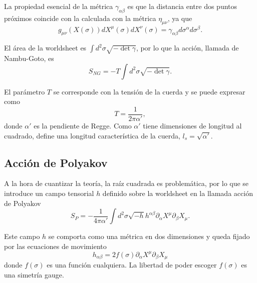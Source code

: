 La propiedad esencial de la métrica $\gamma_{\alpha\beta}$ es que la distancia entre dos puntos próximos 
coincide con la calculada con la métrica $\eta_{\mu\nu}$, ya que
\begin{equation}
  g_{\mu\nu}(X(\sigma)) dX^\mu(\sigma)dX^\nu(\sigma) = \gamma_{\alpha\beta} d\sigma^\alpha d\sigma^\beta.
\end{equation}

El área de la worldsheet es $\int d^2\sigma \sqrt{-\det\gamma}$, por lo que la acción, llamada de Nambu-Goto, es
\begin{equation}
  S_{NG}=-T\int d^2\sigma \sqrt{-\det\gamma}.
\end{equation}

El parámetro $T$ se corresponde con la tensión de la cuerda y se puede expresar como
\begin{equation}
  T=\frac{1}{2\pi\alpha'},
\end{equation}
donde $\alpha'$ es la pendiente de Regge.
Como $\alpha'$ tiene dimensiones de longitud al cuadrado, define una longitud característica
de la cuerda, $l_s=\sqrt{\alpha'}$.

\subsection{Acción de Polyakov}

A la hora de cuantizar la teoría, la raíz cuadrada es problemática, por lo que se introduce
un campo tensorial $h$ definido sobre la worldsheet en la llamada acción de Polyakov
\begin{equation}
  S_P=-\frac{1}{4\pi\alpha'}\int d^2\sigma  \sqrt{-h}h^{\alpha\beta}\partial_\alpha X^\mu \partial_\beta X_\mu.
\end{equation}

Este campo $h$ se comporta como una métrica en dos dimensiones y queda fijado por las
ecuaciones de movimiento
\begin{equation}
  h_{\alpha\beta}=2f(\sigma)\partial_\alpha X^\mu \partial_\beta X_\mu
\end{equation}
donde $f(\sigma)$ es una función cualquiera. La libertad de poder escoger $f(\sigma)$
es una simetría gauge.

